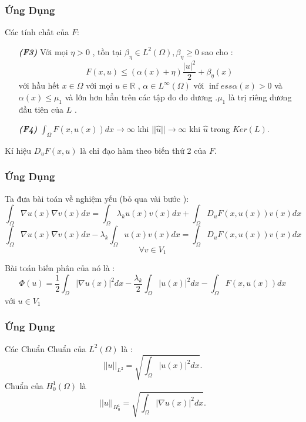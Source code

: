 \documentclass[11pt]{beamer}
\numberwithin{equation}{section}
\theoremstyle{plain}
\theoremstyle{definition}
\theoremstyle{remark}
\begin{document}

\begin{frame}
\frametitle{Ứng Dụng}
\begin{block}{Các tính chất của $F$:}
\begin{itemize}
\item[\textbf{\textit{(F3)}}]  Với mọi $\eta  >0$ , tồn tại $\beta_{\eta}\in L^2(\Omega),\beta_{\eta}\geq 0$ sao cho : $$F(x,u)\leq (\alpha(x)+\eta)\frac{|u|^2}{2}+\beta_{\eta}(x)$$
với hầu hết $x\in \Omega$ với mọi $u\in \mathbb{R}$ , $\alpha \in L^{\infty}(\Omega)$ với $\inf ess \alpha(x)>0$ và $\alpha(x)\leq \mu_1$ và lớn hơn hẳn trên các tập đo đo dương .$\mu_1$ là trị riêng dương đầu tiên của $L$ .
\item[\textbf{\textit{(F4)}}] $\int_{\Omega}F(x,\widehat{u}(x))dx \rightarrow \infty$ khi $||\widehat{u}||\rightarrow \infty$ khi $\widehat{u}$ trong $Ker(L)$.
\end{itemize}
\end{block}
Kí hiệu $D_uF(x,u)$ là chỉ đạo hàm theo biến thứ 2 của $F$.\\
\end{frame}

\begin{frame}
\frametitle{Ứng Dụng}
\begin{block}{Ta đưa bài toán về nghiệm yếu (bỏ qua vài bước ):}
$$\int _{\Omega}\nabla u(x)\nabla v(x)dx=\int _{\Omega}\lambda_k u(x)v(x)dx+\int _{\Omega}D_uF(x,u(x))v(x)dx$$
$$\int _{\Omega}\nabla u(x)\nabla v(x)dx-\lambda_k\int _{\Omega} u(x)v(x)dx=\int _{\Omega}D_uF(x,u(x))v(x)dx$$
$$\forall v\in V_1$$
\end{block}
\begin{block}{Bài toán biến phân của nó là : }
$$\Phi(u)=\frac{1}{2}\int_{\Omega}|\nabla u(x)|^2dx-\frac{\lambda_k}{2}\int _{\Omega} |u(x)|^2dx-\int_{\Omega}F(x,u(x))dx$$
với $u\in V_1$\\
\end{block}
\end{frame}

\begin{frame}
\frametitle{Ứng Dụng}
\begin{block}{Các Chuẩn}
Chuẩn của $L^2(\Omega)$ là : $$||u||_{L^2}=\sqrt{\int_{\Omega}| u(x)|^2dx}.$$
Chuẩn của $H^1_0(\Omega)$ là $$||u||_{H^1_0}=\sqrt{\int_{\Omega}|\nabla u(x)|^2dx}.$$
\end{block}
\end{frame}
\end{document}
